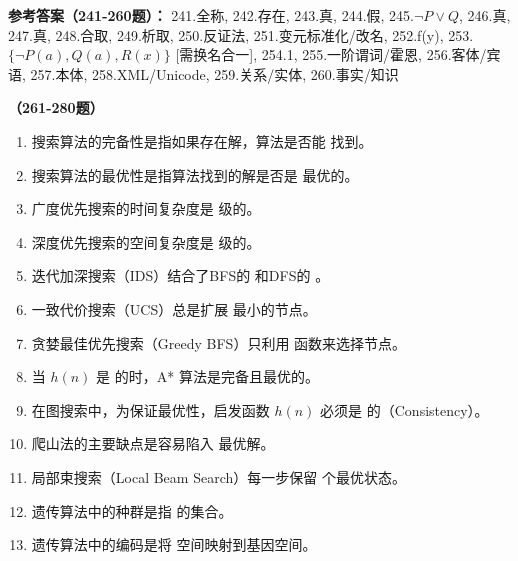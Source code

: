 \textbf{参考答案（241-260题）：}
241.全称, 242.存在, 243.真, 244.假, 245.$\neg P \lor Q$, 246.真, 247.真, 248.合取, 249.析取, 250.反证法, 251.变元标准化/改名, 252.f(y), 253.$\{\neg P(a), Q(a), R(x)\}$ [需换名合一], 254.1, 255.一阶谓词/霍恩, 256.客体/宾语, 257.本体, 258.XML/Unicode, 259.关系/实体, 260.事实/知识

\vspace{1em}
\textbf{（261-280题）}
\begin{enumerate}[resume,leftmargin=2em,itemsep=1pt]
\item 搜索算法的完备性是指如果存在解，算法是否能 \underline{\hspace{3em}} 找到。
\item 搜索算法的最优性是指算法找到的解是否是 \underline{\hspace{3em}} 最优的。
\item 广度优先搜索的时间复杂度是 \underline{\hspace{3em}} 级的。
\item 深度优先搜索的空间复杂度是 \underline{\hspace{3em}} 级的。
\item 迭代加深搜索（IDS）结合了BFS的 \underline{\hspace{3em}} 和DFS的 \underline{\hspace{3em}}。
\item 一致代价搜索（UCS）总是扩展 \underline{\hspace{3em}} 最小的节点。
\item 贪婪最佳优先搜索（Greedy BFS）只利用 \underline{\hspace{3em}} 函数来选择节点。
\item 当 $h(n)$ 是 \underline{\hspace{3em}} 的时，A* 算法是完备且最优的。
\item 在图搜索中，为保证最优性，启发函数 $h(n)$ 必须是 \underline{\hspace{3em}} 的（Consistency）。
\item 爬山法的主要缺点是容易陷入 \underline{\hspace{3em}} 最优解。
\item 局部束搜索（Local Beam Search）每一步保留 \underline{\hspace{3em}} 个最优状态。
\item 遗传算法中的种群是指 \underline{\hspace{3em}} 的集合。
\item 遗传算法中的编码是将 \underline{\hspace{3em}} 空间映射到基因空间。

\end{enumerate}
